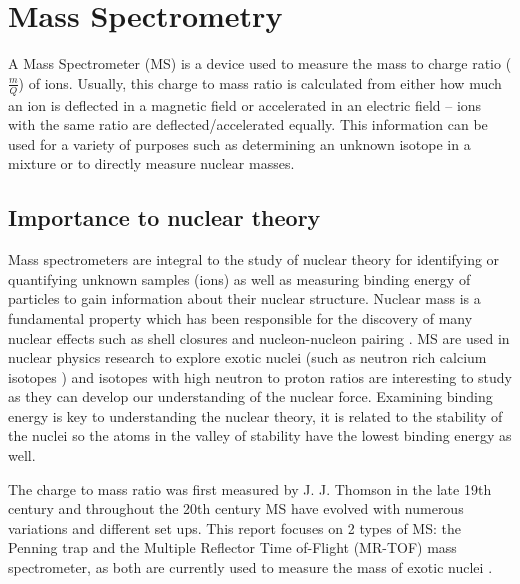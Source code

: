 \section{Mass Spectrometry}
A Mass Spectrometer (MS) is a device used to measure the mass to charge ratio ($\frac{m}{Q}$) of ions.
Usually, this charge to mass ratio is calculated from either how much an ion is deflected in a magnetic field or accelerated in an electric field – ions with the same ratio are deflected/accelerated equally.
This information can be used for a variety of purposes such as determining an unknown isotope in a mixture or to directly measure nuclear masses.

\subsection{Importance to nuclear theory}
Mass spectrometers are integral to the study of nuclear theory for identifying or quantifying unknown samples (ions) as well as measuring binding energy of particles to gain information about their nuclear structure.
Nuclear mass is a fundamental property which has been responsible for the discovery of many nuclear effects such as shell closures and nucleon-nucleon pairing \cite{blaum_precision_2012}.
MS are used in nuclear physics research to explore exotic nuclei (such as neutron rich calcium isotopes \cite{wienholtz}) and isotopes with high neutron to proton ratios are interesting to study as they can develop our understanding of the nuclear force.
Examining binding energy is key to understanding the nuclear theory, it is related to the stability of the nuclei so the atoms in the valley of stability have the lowest binding energy as well.

The charge to mass ratio was first measured by J. J. Thomson in the late 19th century \cite{noauthor_j_nodate} and throughout the 20th century MS have evolved with numerous variations and different set ups.
This report focuses on 2 types of MS: the Penning trap and the Multiple Reflector Time of-Flight (MR-TOF) mass spectrometer, as both are currently used to measure the mass of exotic nuclei \cite{famiano_nuclear_2019}.

